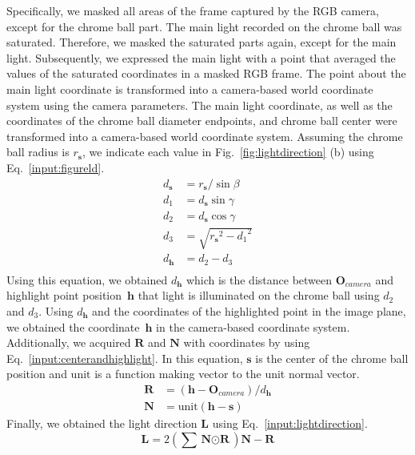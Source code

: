 Specifically, we masked all areas of the frame captured by the RGB camera, except for the chrome ball part. The main light recorded on the chrome ball was saturated. Therefore, we masked the saturated parts again, except for the main light. Subsequently, we expressed the main light with a point that averaged the values of the saturated coordinates in a masked RGB frame. The point about the main light coordinate is transformed into a camera-based world coordinate system using the camera parameters. The main light coordinate, as well as the coordinates of the chrome ball diameter endpoints, and chrome ball center were transformed into a camera-based world coordinate system. Assuming the chrome ball radius is $r_{\textbf{s}}$, we indicate each value in Fig.~\ref{fig:lightdirection} (b) using Eq.~\ref{input:figureld}.
\begin{equation}
\begin{aligned}
d_{\textbf{s}} &= r_{\textbf{s}}/\sin{\beta} \\
d_{1} &= d_{\textbf{s}}\sin{\gamma} \\
d_{2} &= d_{\textbf{s}}\cos{\gamma} \\
d_{3} &= \sqrt{{r_{\textbf{s}}}^{2}-{d_{1}}^{2}} \\
d_{\textbf{h}} &= d_{2}-d_{3} \\
\end{aligned}
\label{input:figureld}
\end{equation}
Using this equation, we obtained $d_{\textbf{h}}$ which is the distance between $\textbf{O}_{camera}$ and highlight point position~$\textbf{h}$ that light is illuminated on the chrome ball using $d_{2}$ and $d_{3}$. Using $d_{\textbf{h}}$ and the coordinates of the highlighted point in the image plane, we obtained the coordinate~$\textbf{h}$ in the camera-based coordinate system. Additionally, we acquired $\textbf{R}$ and $\textbf{N}$ with coordinates by using Eq.~\ref{input:centerandhighlight}. In this equation, $\textbf{s}$ is the center of the chrome ball position and $\text{unit}$ is a function making vector to the unit normal vector.
\begin{equation}
\begin{aligned}
\textbf{R} &= (\textbf{h} - \textbf{O}_{camera})/d_{\textbf{h}} \\
\textbf{N} &= \text{unit}(\textbf{h} - \textbf{s})
\end{aligned}
\label{input:centerandhighlight}
\end{equation}
Finally, we obtained the light direction $\textbf{L}$ using Eq.~\ref{input:lightdirection}.
\begin{equation}
\textbf{L} = 2(\sum{\textbf{N} \odot \textbf{R}})\textbf{N} - \textbf{R}
\label{input:lightdirection}
\end{equation}



